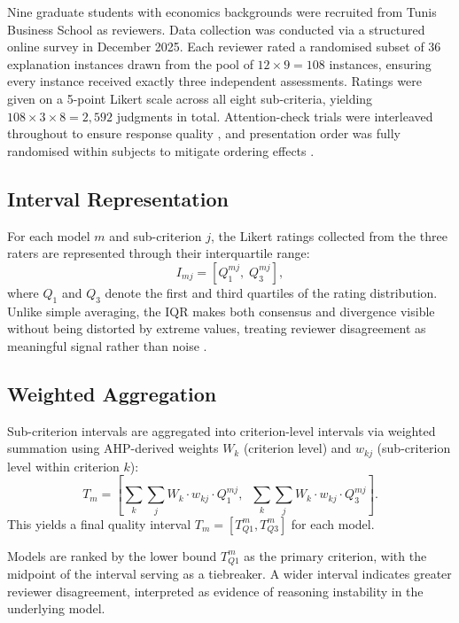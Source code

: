 Nine graduate students with economics backgrounds were recruited from Tunis Business
School as reviewers. Data collection was conducted via a structured online survey in
December 2025. Each reviewer rated a randomised subset of 36 explanation instances
drawn from the pool of $12 \times 9 = 108$ instances, ensuring every instance
received exactly three independent assessments. Ratings were given on a 5-point
Likert scale across all eight sub-criteria, yielding $108 \times 3 \times 8 = 2{,}592$
judgments in total. Attention-check trials were interleaved throughout to ensure
response quality \citep{roth2024attention}, and presentation order was fully
randomised within subjects to mitigate ordering effects \citep{beck2024order}.

\subsection{Interval Representation}
\label{subsec:meth-interval}

For each model $m$ and sub-criterion $j$, the Likert ratings collected from the
three raters are represented through their interquartile range:
\begin{equation}
  I_{mj} = [Q_1^{mj},\; Q_3^{mj}],
  \label{eq:iqr}
\end{equation}
where $Q_1$ and $Q_3$ denote the first and third quartiles of the rating
distribution. Unlike simple averaging, the IQR makes both consensus and divergence
visible without being distorted by extreme values, treating reviewer disagreement
as meaningful signal rather than noise \citep{hayes2007answering}.

\subsection{Weighted Aggregation}
\label{subsec:meth-aggregation2}

Sub-criterion intervals are aggregated into criterion-level intervals via weighted
summation using AHP-derived weights $W_k$ (criterion level) and $w_{kj}$
(sub-criterion level within criterion $k$):
\begin{equation}
  T_m = \left[\sum_{k}\sum_{j} W_k \cdot w_{kj} \cdot Q_1^{mj},\;\;
              \sum_{k}\sum_{j} W_k \cdot w_{kj} \cdot Q_3^{mj}\right].
  \label{eq:aggregate}
\end{equation}
This yields a final quality interval $T_m = [T_{Q1}^m, T_{Q3}^m]$ for each model.

Models are ranked by the lower bound $T_{Q1}^m$ as the primary criterion, with
the midpoint of the interval serving as a tiebreaker. A wider interval indicates
greater reviewer disagreement, interpreted as evidence of reasoning instability in
the underlying model.

